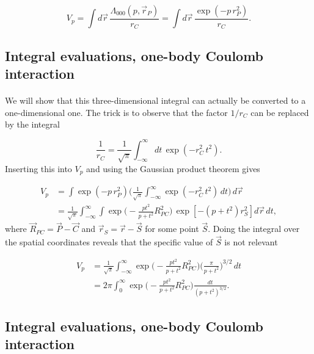 \documentclass[%
twoside,                 %
final,                   %
10pt]{article}
\begin{document}
\begin{equation}
 V_p = \int d\vec r \, \frac{\Lambda_{000}(p,\vec r_P)}{r_C} = \int d\vec r\, \frac{\exp(-p\,r_P^2)}{r_C}.
\end{equation}



\subsection{Integral evaluations, one-body Coulomb interaction}

\paragraph{}

We will show that this three-dimensional integral can actually be converted to a one-dimensional one. The trick is to observe that the factor $1/r_C$ can be replaced by the integral

\begin{equation}
 \frac{1}{r_C} = \frac{1}{\sqrt{\pi}}\int_{-\infty}^\infty dt\,\exp(-r^2_C\,t^2).
\end{equation}
Inserting this into $V_p$ and using the Gaussian product theorem gives

\begin{align}
 V_p & =  \int \exp(-p\,r_P^2)\Big(\frac{1}{\sqrt{\pi}}\int_{-\infty}^\infty\exp(-r^2_C\,t^2)\,dt\Big)\,d\vec r \\
     & =  \frac{1}{\sqrt{\pi}}\int_{-\infty}^\infty\int\exp\Big(-\frac{pt^2}{p + t^2}R^2_{PC}\Big)\,\exp[-(p + t^2)r^2_S] d\vec r\, dt,
\end{align}
where $\vec R_{PC} = \vec P - \vec C$ and $\vec r_S = \vec r - \vec S$ for some point $\vec S$. Doing the integral over the spatial coordinates reveals that the specific value of $\vec S$ is not relevant

\begin{align}
 V_p & =  \frac{1}{\sqrt{\pi}}\int_{-\infty}^\infty\exp\Big(-\frac{pt^2}{p + t^2}R^2_{PC}\Big)\Big(\frac{\pi}{p + t^2}\Big)^{3/2}\,dt \\
     & =  2\pi\int_0^\infty\exp\Big(-\frac{pt^2}{p + t^2}R^2_{PC}\Big)\frac{dt}{(p + t^2)^{3/2}}.
\end{align}



\subsection{Integral evaluations, one-body Coulomb interaction}
\end{document}
